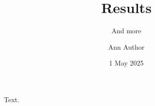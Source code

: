 \documentclass[17pt]{beamer}
\title{Results}
\subtitle{And more}
\author[A. A.]{Ann Author}
\institute[SU]{Some University}
\date[May 2025]{1 May 2025}
\begin{document}
\begin{frame}
\titlepage
\end{frame}
\begin{frame}
Text.
\end{frame}
\end{document}
